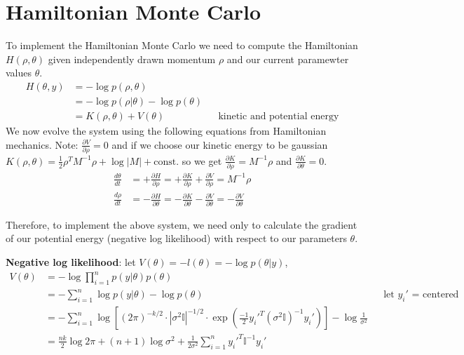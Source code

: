 \documentclass[12pt,letterpaper,twoside]{article}
\begin{document}
\section{Hamiltonian Monte Carlo} 
To implement the Hamiltonian Monte Carlo we need to compute 
the Hamiltonian $H(\rho, \theta)$ given independently drawn momentum 
$\rho$ and our current paramewter values $\theta$. 
\begin{align*}
    H(\theta, y) & = -\log p(\rho, \theta) \\
                 & = - \log p(\rho|\theta) - \log p(\theta) \\
                 & = K(\rho, \theta) + V(\theta) && \text{kinetic and potential energy}
\end{align*}
We now evolve the system using the following equations from 
Hamiltonian mechanics. Note: $\frac{\partial V}{\partial \rho} = 0$ 
and if we choose our kinetic energy to be gaussian 
$K(\rho, \theta) = \frac{1}{2}\rho^T M^{-1} \rho + \log |M| + \text{const.}$ 
so we get $\frac{\partial K}{\partial \rho} = M^{-1} \rho$ and 
$\frac{\partial K}{\partial \theta} = 0$.
\begin{align*}
    \frac{d\theta}{dt} & = + \frac{\partial H}{\partial \rho} = + \frac{\partial K}{\partial \rho} + \frac{\partial V}{\partial \rho} = M^{-1} \rho \\
    \frac{d\rho}{dt}   & = - \frac{\partial H}{\partial \theta} = -\frac{\partial K}{\partial \theta} - \frac{\partial V}{\partial \theta} = -\frac{\partial V}{\partial \theta}
\end{align*}

Therefore, to implement the above system, we need only to calculate 
the gradient of our potential energy (negative log likelihood) with 
respect to our parameters $\theta$.

\textbf{Negative log likelihood}: let $V(\theta) = -l(\theta) = -\log p(\theta|y)$,
\begin{align*}
    V(\theta) & = - \log \prod_{i=1}^n p(y|\theta) p(\theta) \\
              & = - \sum_{i=1}^n \log p(y|\theta) - \log p(\theta) && \text{let $y_i'$ = centered data}\\
              & = - \sum_{i=1}^n \log \left[(2\pi)^{-k/2} \cdot |\sigma^2 \mathbb{I}|^{-1/2} \cdot \exp(\frac{-1}{2} y_i'^T (\sigma^2 \mathbb{I})^{-1} y_i')\right] - \log \frac{1}{\sigma^2} \\
              & = \frac{nk}{2} \log 2\pi + (n+1) \log \sigma^2 + \frac{1}{2\sigma^2} \sum_{i=1}^n y_i'^T \mathbb{I}^{-1} y_i'       
\end{align*}
\end{document}

